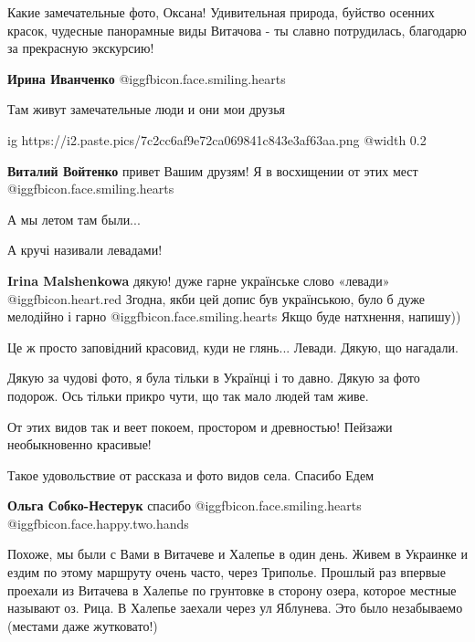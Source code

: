 \begin{itemize}

Какие замечательные фото, Оксана! Удивительная природа, буйство осенних
красок, чудесные панорамные виды Витачова - ты славно потрудилась, благодарю за
прекрасную экскурсию!


\textbf{Ирина Иванченко}  @igg{fbicon.face.smiling.hearts} 

Там живут замечательные люди и они мои друзья

\ifcmt
  ig https://i2.paste.pics/7c2cc6af9e72ca069841c843e3af63aa.png
  @width 0.2
\fi

\textbf{Виталий Войтенко} привет Вашим друзям! Я в восхищении от этих мест @igg{fbicon.face.smiling.hearts} 

А мы летом там были...

А кручі називали левадами!

\begin{itemize} %
\textbf{Irina Malshenkowa} дякую! дуже гарне українське слово «левади» @igg{fbicon.heart.red}
Згодна, якби цей допис був українською, було б дуже мелодійно і гарно @igg{fbicon.face.smiling.hearts} 
Якщо буде натхнення, напишу))
\end{itemize} %

Це ж просто заповідний красовид, куди не глянь... Левади. Дякую, що нагадали.


Дякую за чудові фото, я була тільки в Українці і то давно. Дякую за фото
подорож. Ось тільки прикро чути, що так мало людей там живе.

От этих видов так и веет покоем, простором и древностью! Пейзажи необыкновенно красивые!

Такое удовольствие от рассказа и фото видов села. Спасибо Едем

\textbf{Ольга Собко-Нестерук} спасибо @igg{fbicon.face.smiling.hearts}  @igg{fbicon.face.happy.two.hands} 


Похоже, мы были с Вами в Витачеве и Халепье в один день. Живем в Украинке и ездим
по этому маршруту очень часто, через Триполье. Прошлый раз впервые проехали из
Витачева в Халепье по грунтовке в сторону озера, которое местные называют
оз. Рица. В Халепье заехали через ул Яблунева. Это было незабываемо (местами даже
жутковато!)



\end{itemize}
